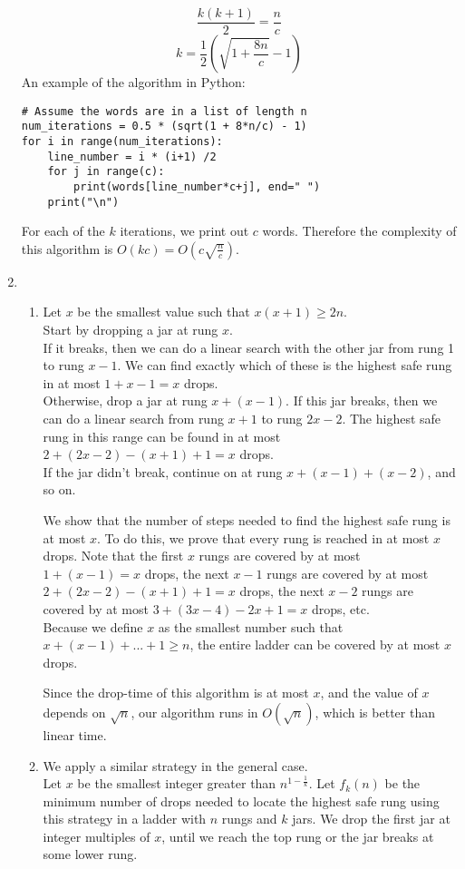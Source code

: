 \documentclass[12 pt, oneside]{article}
\begin{document}
\begin{enumerate}
$$\frac{k(k+1)}{2} = \frac{n}{c} $$
$$k = \frac{1}{2}(\sqrt{1 + \frac{8n}{c}} -1) $$
An example of the algorithm in Python:
\begin{lstlisting}
# Assume the words are in a list of length n
num_iterations = 0.5 * (sqrt(1 + 8*n/c) - 1)
for i in range(num_iterations):
	line_number = i * (i+1) /2
	for j in range(c):
		print(words[line_number*c+j], end=" ")
	print("\n")
\end{lstlisting}
For each of the $k$ iterations, we print out $c$ words. Therefore the complexity of this algorithm is $O(kc) = O(c\sqrt{\frac{n}{c}})$.
\clearpage
\item
\begin{enumerate}
\item
Let $x$ be the smallest value such that $x(x+1) \ge 2n$. \\
Start by dropping a jar at rung $x$. \\
If it breaks, then we can do a linear search with the other jar from rung 1 to rung $x-1$. We can find exactly which of these is the highest safe rung in at most $1 + x - 1 = x$ drops. \\
Otherwise, drop a jar at rung $x + (x-1)$. If this jar breaks, then we can do a linear search from rung $x+1$ to rung $2x -2$. The highest safe rung in this range can be found in at most $2 + (2x-2) - (x+1) + 1 = x$ drops. \\
If the jar didn't break, continue on at rung $x + (x-1) + (x-2)$, and so on. \\
\par We show that the number of steps needed to find the highest safe rung is at most $x$. To do this, we prove that every rung is reached in at most $x$ drops. Note that the first $x$ rungs are covered by at most $1 + (x-1) = x$ drops, the next $x-1$ rungs are covered by at most $2 + (2x-2) - (x+1) + 1 = x$ drops, the next $x-2$ rungs are covered by at most $3 + (3x-4) - 2x + 1 = x$ drops, etc.\\
Because we define $x$ as the smallest number such that $x + (x-1) + ... + 1 \ge n$, the entire ladder can be covered by at most $x$ drops. \\
\par Since the drop-time of this algorithm is at most $x$, and the value of $x$ depends on $\sqrt{n}$, our algorithm runs in $O(\sqrt{n})$, which is better than linear time.
\item 
We apply a similar strategy in the general case. \\
Let $x$ be the smallest integer greater than $n^{1 - \frac{1}{k}}$. Let $f_k(n)$ be the minimum number of drops needed to locate the highest safe rung using this strategy in a ladder with $n$ rungs and $k$ jars. We drop the first jar at integer multiples of $x$, until we reach the top rung or the jar breaks at some lower rung. \\

\end{enumerate}
\end{enumerate}
\end{document}
